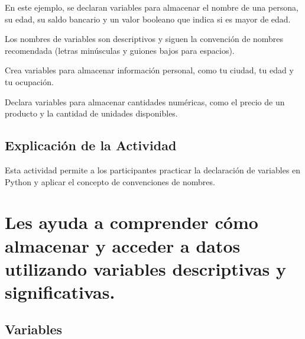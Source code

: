 \documentclass[
  a4paper,
  DIV=11,
  numbers=noendperiod,
  onepage,
  openany]{scrreprt}
\begin{document}
En este ejemplo, se declaran variables para almacenar el nombre de una
persona, su edad, su saldo bancario y un valor booleano que indica si es
mayor de edad.

Los nombres de variables son descriptivos y siguen la convención de
nombres recomendada (letras minúsculas y guiones bajos para espacios).

\begin{tcolorbox}[enhanced jigsaw, colbacktitle=quarto-callout-important-color!10!white, toprule=.15mm, leftrule=.75mm, titlerule=0mm, opacityback=0, rightrule=.15mm, opacitybacktitle=0.6, breakable, left=2mm, coltitle=black, title=\textcolor{quarto-callout-important-color}{\faExclamation}\hspace{0.5em}{Actividad Práctica}, toptitle=1mm, bottomtitle=1mm, arc=.35mm, bottomrule=.15mm, colback=white, colframe=quarto-callout-important-color-frame]

Crea variables para almacenar información personal, como tu ciudad, tu
edad y tu ocupación.

Declara variables para almacenar cantidades numéricas, como el precio de
un producto y la cantidad de unidades disponibles.

\end{tcolorbox}

\hypertarget{explicaciuxf3n-de-la-actividad-8}{%
\section{Explicación de la
Actividad}\label{explicaciuxf3n-de-la-actividad-8}}

Esta actividad permite a los participantes practicar la declaración de
variables en Python y aplicar el concepto de convenciones de nombres.

\hypertarget{les-ayuda-a-comprender-cuxf3mo-almacenar-y-acceder-a-datos-utilizando-variables-descriptivas-y-significativas.}{%
\chapter{Les ayuda a comprender cómo almacenar y acceder a datos
utilizando variables descriptivas y
significativas.}\label{les-ayuda-a-comprender-cuxf3mo-almacenar-y-acceder-a-datos-utilizando-variables-descriptivas-y-significativas.}}

\hypertarget{variables-4}{%
\section{Variables}\label{variables-4}}
\end{document}
